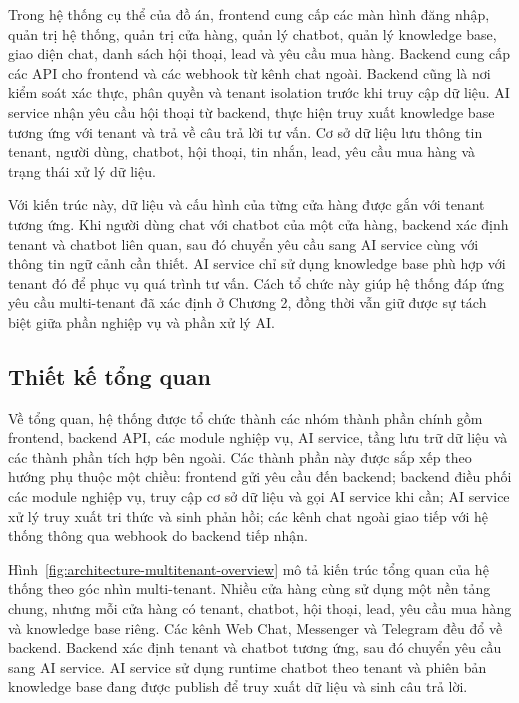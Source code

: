 \documentclass[../DoAn.tex]{subfiles}
\begin{document}
Trong hệ thống cụ thể của đồ án, frontend cung cấp các màn hình đăng nhập, quản trị hệ thống, quản trị cửa hàng, quản lý chatbot, quản lý knowledge base, giao diện chat, danh sách hội thoại, lead và yêu cầu mua hàng. Backend cung cấp các API cho frontend và các webhook từ kênh chat ngoài. Backend cũng là nơi kiểm soát xác thực, phân quyền và tenant isolation trước khi truy cập dữ liệu. AI service nhận yêu cầu hội thoại từ backend, thực hiện truy xuất knowledge base tương ứng với tenant và trả về câu trả lời tư vấn. Cơ sở dữ liệu lưu thông tin tenant, người dùng, chatbot, hội thoại, tin nhắn, lead, yêu cầu mua hàng và trạng thái xử lý dữ liệu.

Với kiến trúc này, dữ liệu và cấu hình của từng cửa hàng được gắn với tenant tương ứng. Khi người dùng chat với chatbot của một cửa hàng, backend xác định tenant và chatbot liên quan, sau đó chuyển yêu cầu sang AI service cùng với thông tin ngữ cảnh cần thiết. AI service chỉ sử dụng knowledge base phù hợp với tenant đó để phục vụ quá trình tư vấn. Cách tổ chức này giúp hệ thống đáp ứng yêu cầu multi-tenant đã xác định ở Chương 2, đồng thời vẫn giữ được sự tách biệt giữa phần nghiệp vụ và phần xử lý AI.

\subsection{Thiết kế tổng quan}

Về tổng quan, hệ thống được tổ chức thành các nhóm thành phần chính gồm frontend, backend API, các module nghiệp vụ, AI service, tầng lưu trữ dữ liệu và các thành phần tích hợp bên ngoài. Các thành phần này được sắp xếp theo hướng phụ thuộc một chiều: frontend gửi yêu cầu đến backend; backend điều phối các module nghiệp vụ, truy cập cơ sở dữ liệu và gọi AI service khi cần; AI service xử lý truy xuất tri thức và sinh phản hồi; các kênh chat ngoài giao tiếp với hệ thống thông qua webhook do backend tiếp nhận.

Hình~\ref{fig:architecture-multitenant-overview} mô tả kiến trúc tổng quan của hệ thống theo góc nhìn multi-tenant. Nhiều cửa hàng cùng sử dụng một nền tảng chung, nhưng mỗi cửa hàng có tenant, chatbot, hội thoại, lead, yêu cầu mua hàng và knowledge base riêng. Các kênh Web Chat, Messenger và Telegram đều đổ về backend. Backend xác định tenant và chatbot tương ứng, sau đó chuyển yêu cầu sang AI service. AI service sử dụng runtime chatbot theo tenant và phiên bản knowledge base đang được publish để truy xuất dữ liệu và sinh câu trả lời.
\end{document}
